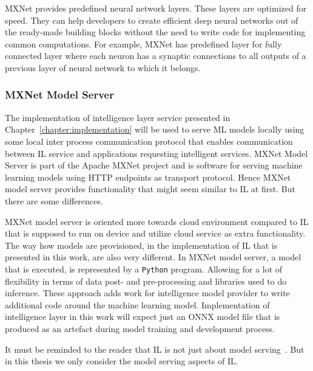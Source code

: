 \documentclass[english, 12pt, a4paper, elec, utf8, online]{aaltothesis}
\begin{document}
MXNet provides predefined neural network layers. These layers are optimized for speed.
They can help developers to create efficient deep neural networks out of the ready-made building blocks without the need to write code for implementing common computations. For example, MXNet has predefined layer for fully connected layer where each neuron has a synaptic connections to all outputs of a previous layer of neural network to which it belongs.



\subsubsection{MXNet Model Server}
The implementation of intelligence layer service presented in Chapter~\ref{chapter:implementation} will be used to serve ML models locally using some local inter process communication protocol that enables communication between IL service and applications requesting intelligent services. MXNet Model Server is part of the Apache MXNet project and is software for serving machine learning models using HTTP endpoints as transport protocol. Hence MXNet model server provides functionality that might seem similar to IL at first. But there are some differences.

MXNet model server is oriented more towards cloud environment compared to IL that is supposed to run on device and utilize cloud service as extra functionality. The way how models are provisioned, in the implementation of IL that is presented in this work, are also very different. In MXNet model server, a model that is executed, is represented by a \texttt{Python} program. Allowing for a lot of flexibility in terms of data post- and pre-processing and libraries used to do inference. These approach adds work for intelligence model provider to write additional code around the machine learning model. Implementation of intelligence layer in this work will expect just an ONNX model file that is produced as an artefact during model training and development process.            

It must be reminded to the reader that IL is not just about model serving~\cite{edgar2019}. But in this thesis we only consider the model serving aspects of IL.  
\end{document}
